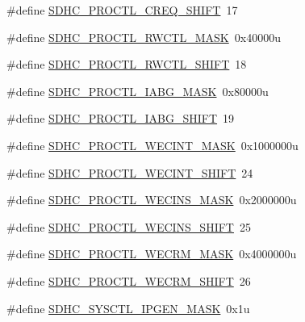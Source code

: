 \begin{DoxyCompactItemize}
\item 
\#define \hyperlink{group___s_d_h_c___register___masks_ga8b783b0ab48e4f66cafa6fc7da38cfbb}{S\+D\+H\+C\+\_\+\+P\+R\+O\+C\+T\+L\+\_\+\+C\+R\+E\+Q\+\_\+\+S\+H\+I\+FT}~17
\item 
\#define \hyperlink{group___s_d_h_c___register___masks_gadefa120c89ff122b91a0fda6b551930a}{S\+D\+H\+C\+\_\+\+P\+R\+O\+C\+T\+L\+\_\+\+R\+W\+C\+T\+L\+\_\+\+M\+A\+SK}~0x40000u
\item 
\#define \hyperlink{group___s_d_h_c___register___masks_ga3ba901ecf6267198e180a9299b4c430c}{S\+D\+H\+C\+\_\+\+P\+R\+O\+C\+T\+L\+\_\+\+R\+W\+C\+T\+L\+\_\+\+S\+H\+I\+FT}~18
\item 
\#define \hyperlink{group___s_d_h_c___register___masks_ga837bace762b865593415b31c06dbf5c4}{S\+D\+H\+C\+\_\+\+P\+R\+O\+C\+T\+L\+\_\+\+I\+A\+B\+G\+\_\+\+M\+A\+SK}~0x80000u
\item 
\#define \hyperlink{group___s_d_h_c___register___masks_gaf62ddb022a19e9fe0ce3d39eeffadd4a}{S\+D\+H\+C\+\_\+\+P\+R\+O\+C\+T\+L\+\_\+\+I\+A\+B\+G\+\_\+\+S\+H\+I\+FT}~19
\item 
\#define \hyperlink{group___s_d_h_c___register___masks_ga08649036ee7355491608a89004ab0628}{S\+D\+H\+C\+\_\+\+P\+R\+O\+C\+T\+L\+\_\+\+W\+E\+C\+I\+N\+T\+\_\+\+M\+A\+SK}~0x1000000u
\item 
\#define \hyperlink{group___s_d_h_c___register___masks_ga575db16a4ed36389472243d329f5ec7c}{S\+D\+H\+C\+\_\+\+P\+R\+O\+C\+T\+L\+\_\+\+W\+E\+C\+I\+N\+T\+\_\+\+S\+H\+I\+FT}~24
\item 
\#define \hyperlink{group___s_d_h_c___register___masks_gabd871a9e13415808e1743df5b4758d83}{S\+D\+H\+C\+\_\+\+P\+R\+O\+C\+T\+L\+\_\+\+W\+E\+C\+I\+N\+S\+\_\+\+M\+A\+SK}~0x2000000u
\item 
\#define \hyperlink{group___s_d_h_c___register___masks_ga33b81350df7f8c5cc698135c271bbfbb}{S\+D\+H\+C\+\_\+\+P\+R\+O\+C\+T\+L\+\_\+\+W\+E\+C\+I\+N\+S\+\_\+\+S\+H\+I\+FT}~25
\item 
\#define \hyperlink{group___s_d_h_c___register___masks_ga296669c47b763f48caf28c35c1be2240}{S\+D\+H\+C\+\_\+\+P\+R\+O\+C\+T\+L\+\_\+\+W\+E\+C\+R\+M\+\_\+\+M\+A\+SK}~0x4000000u
\item 
\#define \hyperlink{group___s_d_h_c___register___masks_ga6f445b202ea272428a7507952b79a889}{S\+D\+H\+C\+\_\+\+P\+R\+O\+C\+T\+L\+\_\+\+W\+E\+C\+R\+M\+\_\+\+S\+H\+I\+FT}~26
\item 
\#define \hyperlink{group___s_d_h_c___register___masks_ga35cc08217531a736cec185c65abe7f82}{S\+D\+H\+C\+\_\+\+S\+Y\+S\+C\+T\+L\+\_\+\+I\+P\+G\+E\+N\+\_\+\+M\+A\+SK}~0x1u

\end{DoxyCompactItemize}
